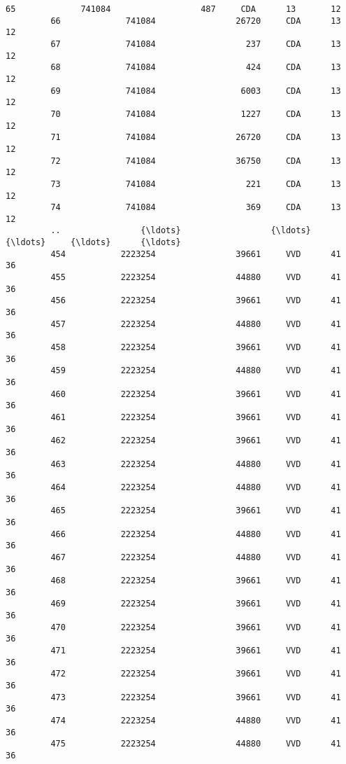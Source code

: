 \documentclass{article}
\begin{document}
\begin{Verbatim}[commandchars=\\\{\}]
         65             741084                  487     CDA      13       12   
         66             741084                26720     CDA      13       12   
         67             741084                  237     CDA      13       12   
         68             741084                  424     CDA      13       12   
         69             741084                 6003     CDA      13       12   
         70             741084                 1227     CDA      13       12   
         71             741084                26720     CDA      13       12   
         72             741084                36750     CDA      13       12   
         73             741084                  221     CDA      13       12   
         74             741084                  369     CDA      13       12   
         ..                {\ldots}                  {\ldots}     {\ldots}     {\ldots}      {\ldots}   
         454           2223254                39661     VVD      41       36   
         455           2223254                44880     VVD      41       36   
         456           2223254                39661     VVD      41       36   
         457           2223254                44880     VVD      41       36   
         458           2223254                39661     VVD      41       36   
         459           2223254                44880     VVD      41       36   
         460           2223254                39661     VVD      41       36   
         461           2223254                39661     VVD      41       36   
         462           2223254                39661     VVD      41       36   
         463           2223254                44880     VVD      41       36   
         464           2223254                44880     VVD      41       36   
         465           2223254                39661     VVD      41       36   
         466           2223254                44880     VVD      41       36   
         467           2223254                44880     VVD      41       36   
         468           2223254                39661     VVD      41       36   
         469           2223254                39661     VVD      41       36   
         470           2223254                39661     VVD      41       36   
         471           2223254                39661     VVD      41       36   
         472           2223254                39661     VVD      41       36   
         473           2223254                39661     VVD      41       36   
         474           2223254                44880     VVD      41       36   
         475           2223254                44880     VVD      41       36   

\end{Verbatim}
\end{document}
